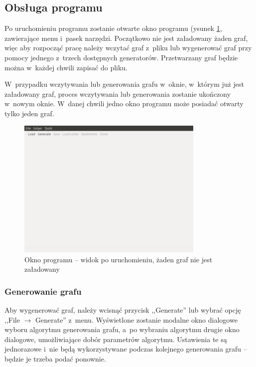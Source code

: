 \documentclass[a4paper,onecolumn,oneside,12pt]{mwart}
\begin{document}
\subsection{Obsługa programu}

Po uruchomieniu programu zostanie otwarte okno programu (ysunek
\ref{fig:scr:empty}, zawierające menu i~pasek narzędzi. Początkowo nie jest
załadowany żaden graf, więc aby rozpocząć pracę należy wczytać graf z~pliku
lub wygenerować graf przy pomocy jednego z~trzech dostępnych generatorów.
Przetwarzany graf będzie można w~każdej chwili zapisać do pliku.

W~przypadku wczytywania lub generowania grafu w~oknie, w~którym już jest
załadowany graf, proces wczytywania lub generowania zostanie ukończony
w~nowym oknie. W~danej chwili jedno okno programu może posiadać otwarty
tylko jeden graf.

\begin{figure}[tpb]
	\begin{center}
		\includegraphics[width=0.8\textwidth]{screenshots/empty.png}
	\end{center}
	\caption{Okno programu -- widok po uruchomieniu, żaden graf nie jest
	załadowany}
	\label{fig:scr:empty}
\end{figure}

\subsubsection{Generowanie grafu}

Aby wygenerować graf, należy wcisnąć przycisk ,,Generate'' lub wybrać opcję
,,File $\rightarrow$ Generate'' z~menu. Wyświetlone zostanie modalne okno
dialogowe wyboru algorytmu generowania grafu, a~po wybraniu algorytmu
drugie okno dialogowe, umożliwiające dobór parametrów algorytmu. Ustawienia
te są jednorazowe i~nie będą wykorzystywane podczas kolejnego generowania
grafu -- będzie je trzeba podać ponownie.
\end{document}
